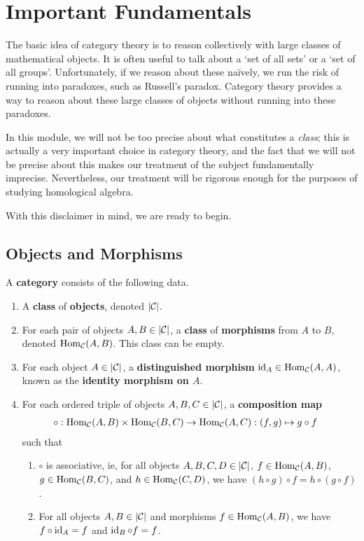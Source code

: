 \section{Important Fundamentals}

The basic idea of category theory is to reason collectively with large classes of mathematical objects. It is often useful to talk about a `set of all sets' or a `set of all groups'. Unfortunately, if we reason about these naïvely, we run the risk of running into paradoxes, such as Russell's paradox. Category theory provides a way to reason about these large classes of objects without running into these paradoxes.

In this module, we will not be too precise about what constitutes a \textit{class}; this is actually a very important choice in category theory, and the fact that we will not be precise about this makes our treatment of the subject fundamentally imprecise. Nevertheless, our treatment will be rigorous enough for the purposes of studying homological algebra.

With this disclaimer in mind, we are ready to begin.

\subsection{Objects and Morphisms}

\begin{boxdefinition}[Category]
    A \textbf{category} consists of the following data.
    \begin{enumerate}
        \item A \textbf{class} of \textbf{objects}, denoted $\left\lvert \mathcal{C} \right\rvert$.
        \item For each pair of objects $A, B \in \left\lvert \mathcal{C} \right\rvert$, a \textbf{class} of \textbf{morphisms} from $A$ to $B$, denoted $\operatorname{Hom}_{\mathcal{C}}\!\left( A, B \right)$. This class can be empty.
        \item For each object $A \in \left\lvert \mathcal{C} \right\rvert$, a \textbf{distinguished morphism} $\operatorname{id}_A \in \operatorname{Hom}_{\mathcal{C}}\!\left( A, A \right)$, known as the \textbf{identity morphism on $A$}.
        \item For each ordered triple of objects $A, B, C \in \left\lvert \mathcal{C} \right\rvert$, a \textbf{composition map}
        \begin{align*}
            \circ : \operatorname{Hom}_{\mathcal{C}}\!\left( A, B \right) \times \operatorname{Hom}_{\mathcal{C}}\!\left( B, C \right) &\to \operatorname{Hom}_{\mathcal{C}}\!\left( A, C \right) : (f, g) \mapsto g \circ f
        \end{align*}
        such that
        \begin{enumerate}[noitemsep, label = (\roman*)]
            \item $\circ$ is associative, ie, for all objects $A, B, C, D \in \left\lvert \mathcal{C} \right\rvert$, $f \in \operatorname{Hom}_{\mathcal{C}}\!\left( A, B \right)$, $g \in \operatorname{Hom}_{\mathcal{C}}\!\left( B, C \right)$, and $h \in \operatorname{Hom}_{\mathcal{C}}\!\left( C, D \right)$, we have $(h \circ g) \circ f = h \circ (g \circ f)$.
            \item For all objects $A, B \in \left\lvert \mathcal{C} \right\rvert$ and morphisms $f \in \operatorname{Hom}_{\mathcal{C}}\!\left( A, B \right)$, we have $f \circ \operatorname{id}_A = f$ and $\operatorname{id}_B \circ f = f$.
        \end{enumerate}
    \end{enumerate}
\end{boxdefinition}

